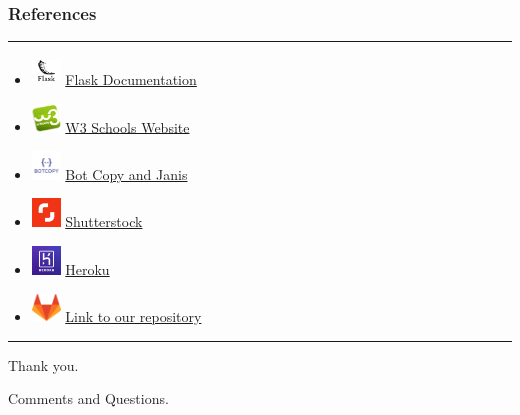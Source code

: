 \documentclass[14pt]{beamer}
\begin{document}
\begin{frame}
	\frametitle{References}
    \noindent
    {\color{pink} \rule{\linewidth}{0.7mm}}
    \begin{itemize}
        \item [] \includegraphics[width=0.3in, height=0.3in]{./Codiac/logos/documentation.png} \href{https://flask.palletsprojects.com/en/1.1.x/} {Flask Documentation}\\
            
        \item [] \includegraphics[width=0.3in, height=0.3in]{./Codiac/logos/w3schools.png} \href{https://www.w3schools.com/} {W3 Schools Website}\\
            \item [] \includegraphics[width=0.3in, height=0.3in]{./Codiac/logos/botcopy.png} \href{https://www.botcopy.com/} {Bot Copy and Janis}\\
                    \item [] \includegraphics[width=0.3in, height=0.3in]{./Codiac/logos/shutter.png} \href{https://www.shutterstock.com/?rid=170336628&gclid=Cj0KCQjwnqH7BRDdARIsACTSAdvbnRVMWw3_B9aDsAxuGgPnMgjnuE9Gdei2Z510VfgXOn-pviSB-YMaAv6vEALw_wcB} {Shutterstock}\\
                    \item [] \includegraphics[width=0.3in, height=0.3in]{./Codiac/logos/heroku.jpg} \href{https://signup.heroku.com/t/platform?c=7013A000000ib1xQAA&gclid=CjwKCAjwh7H7BRBBEiwAPXjadvVFuTYB80whEdGEBINmJF2RsYPX9X7iwQU11dya8QJAOFCxENHdrRoCiaMQAvD_BwE}{Heroku}\\
                     \item [] \includegraphics[width=0.3in, height=0.3in]{./Codiac/logos/gitlab.png} \href{https://gitlab.com/ksaisudha24/Codiac}{Link to our repository}\\
    \end{itemize}
    \noindent
    {\color{pink} \rule{\linewidth}{0.7mm}}
\end{frame}

\begin{frame}
    \centerline {\huge \color{dr}Thank you.}
    \centerline {\huge \color{dr}Comments and Questions.}
\end{frame}
\end{document}

